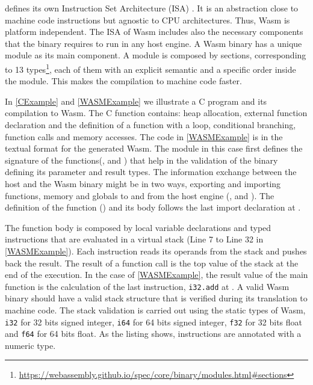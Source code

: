 \wasm defines its own Instruction Set Architecture (ISA) \cite{wasm_spec}. It is an abstraction close to machine code instructions but agnostic to CPU architectures. Thus, Wasm  is platform independent. The ISA of Wasm  includes also the necessary components that the binary requires to run in any host engine. 
A Wasm  binary has a unique module as its main component. A module is composed by sections, corresponding to 13 types\footnote{\url{https://webassembly.github.io/spec/core/binary/modules.html\#sections}}, each of them with an explicit semantic and a specific order inside the module. This makes the compilation to machine code faster. %


In \autoref{CExample} and \autoref{WASMExample} we illustrate a C program and its compilation to Wasm. The C function contains: heap allocation, external function declaration and the definition of a function with a loop, conditional branching, function calls and memory accesses. The code in \autoref{WASMExample} is in the textual format for the generated Wasm. The module in this case first defines the signature of the functions(,   and  )  that help in the validation of the binary defining its parameter and result types. The information exchange between the host and the Wasm  binary might be in two ways, exporting and importing functions, memory and globals to and from the host engine (,  and ). The definition of the function () and its body follows the last import declaration at . 

The function body is composed by local variable declarations and typed instructions that are evaluated in a virtual stack (Line 7 to Line 32 in \autoref{WASMExample}). Each instruction reads its operands from the stack and pushes back the result. The result of a function call is the top value of the stack at the end of the execution. In the case of \autoref{WASMExample}, the result value of the main function is the calculation of the last instruction, \texttt{i32.add} at . A valid Wasm  binary should have a valid stack structure that is verified during its translation to machine code. The stack validation is carried out using the static types of Wasm, \texttt{i32} for 32 bits signed integer, \texttt{i64} for 64 bits signed integer, \texttt{f32} for 32 bits float and \texttt{f64} for 64 bits float. As the listing shows, instructions are annotated with a numeric type.


